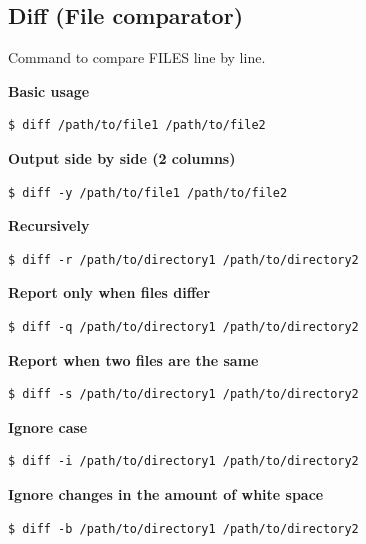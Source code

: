 \documentclass{article}
\newenvironment{codetemplate}[1][]{%
  \mybasecolorbox[#1]
  \itshape
}{%
  \endmybasecolorbox
}
\begin{document}
\subsection{Diff (File comparator)}
Command to compare FILES line by line.

\textbf{Basic usage}
\begin{codetemplate}{}
\begin{verbatim}
$ diff /path/to/file1 /path/to/file2
\end{verbatim}
\end{codetemplate}

\textbf{Output side by side (2 columns)}
\begin{codetemplate}{}
\begin{verbatim}
$ diff -y /path/to/file1 /path/to/file2
\end{verbatim}
\end{codetemplate}

\textbf{Recursively}
\begin{codetemplate}{}
\begin{verbatim}
$ diff -r /path/to/directory1 /path/to/directory2
\end{verbatim}
\end{codetemplate}

\textbf{Report only when files differ}
\begin{codetemplate}{}
\begin{verbatim}
$ diff -q /path/to/directory1 /path/to/directory2
\end{verbatim}
\end{codetemplate}

\textbf{Report when two files are the same}
\begin{codetemplate}{}
\begin{verbatim}
$ diff -s /path/to/directory1 /path/to/directory2
\end{verbatim}
\end{codetemplate}

\textbf{Ignore case}
\begin{codetemplate}{}
\begin{verbatim}
$ diff -i /path/to/directory1 /path/to/directory2
\end{verbatim}
\end{codetemplate}

\textbf{Ignore changes in the amount of white space}
\begin{codetemplate}{}
\begin{verbatim}
$ diff -b /path/to/directory1 /path/to/directory2
\end{verbatim}
\end{codetemplate}
\end{document}
